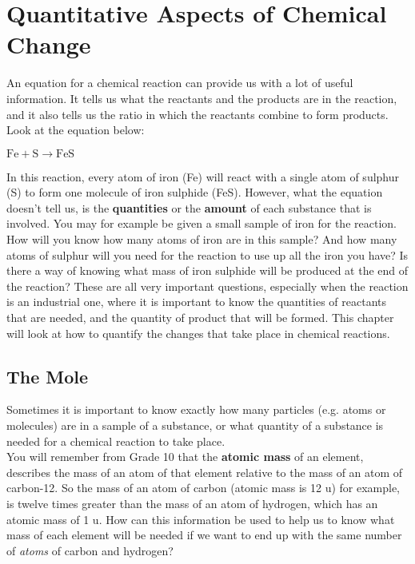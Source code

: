 \chapter{Quantitative Aspects of Chemical Change}
\label{chap:quant}

An equation for a chemical reaction can provide us with a lot of useful information. It tells us what the reactants and the products are in the reaction, and it also tells us the ratio in which the reactants combine to form products. Look at the equation below:

\begin{center}
${\text{Fe} + \text{S} \rightarrow \text{FeS}}$\\
\end{center}

In this reaction, every atom of iron (Fe) will react with a single atom of sulphur (S) to form one molecule of iron sulphide (FeS). However, what the equation doesn't tell us, is the \textbf{quantities} or the \textbf{amount} of each substance that is involved. You may for example be given a small sample of iron for the reaction. How will you know how many atoms of iron are in this sample? And how many atoms of sulphur will you need for the reaction to use up all the iron you have? Is there a way of knowing what mass of iron sulphide will be produced at the end of the reaction? These are all very important questions, especially when the reaction is an industrial one, where it is important to know the quantities of reactants that are needed, and the quantity of product that will be formed. This chapter will look at how to quantify the changes that take place in chemical reactions.




\section{The Mole}
\label{sec:quant:mole}

Sometimes it is important to know exactly how many particles (e.g.\@{} atoms or molecules) are in a sample of a substance, or what quantity of a substance is needed for a chemical reaction to take place.\\

You will remember from Grade 10 that the \textbf{atomic mass} of an element, describes the mass of an atom of that element relative to the mass of an atom of carbon-12. So the mass of an atom of carbon (atomic mass is 12 u) for example, is twelve times greater than the mass of an atom of hydrogen, which has an atomic mass of 1 u. How can this information be used to help us to know what mass of each element will be needed if we want to end up with the same number of \textit{atoms} of carbon and hydrogen?\\

